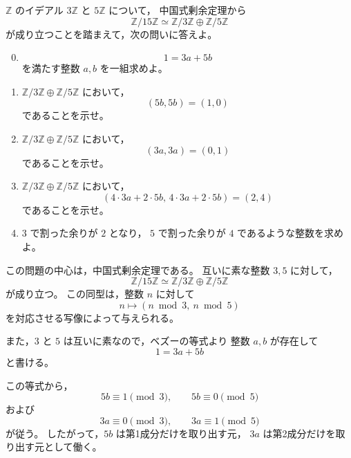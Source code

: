 
\begin{exercise}
	\(\mathbb{Z}\) のイデアル \(3\mathbb{Z}\) と \(5\mathbb{Z}\) について，
	中国式剰余定理から
	\[
	\mathbb{Z}/15\mathbb{Z}
	\simeq
	\mathbb{Z}/3\mathbb{Z}
	\oplus
	\mathbb{Z}/5\mathbb{Z}
	\]
	が成り立つことを踏まえて，次の問いに答えよ。
	
	\begin{enumerate}
		\setcounter{enumi}{-1}
		
		\item
		\[
		1=3a+5b
		\]
		を満たす整数 \(a,b\) を一組求めよ。
		
		\item
		\(\mathbb{Z}/3\mathbb{Z}\oplus\mathbb{Z}/5\mathbb{Z}\) において，
		\[
		(5b,5b)=(1,0)
		\]
		であることを示せ。
		
		\item
		\(\mathbb{Z}/3\mathbb{Z}\oplus\mathbb{Z}/5\mathbb{Z}\) において，
		\[
		(3a,3a)=(0,1)
		\]
		であることを示せ。
		
		\item
		\(\mathbb{Z}/3\mathbb{Z}\oplus\mathbb{Z}/5\mathbb{Z}\) において，
		\[
		(4\cdot 3a+2\cdot 5b,\,
		4\cdot 3a+2\cdot 5b)
		=
		(2,4)
		\]
		であることを示せ。
		
		\item
		\(3\) で割った余りが \(2\) となり，
		\(5\) で割った余りが \(4\) であるような整数を求めよ。
	\end{enumerate}
\end{exercise}

\begin{background}
	この問題の中心は，中国式剰余定理である。
	互いに素な整数 \(3,5\) に対して，
	\[
	\mathbb{Z}/15\mathbb{Z}
	\simeq
	\mathbb{Z}/3\mathbb{Z}
	\oplus
	\mathbb{Z}/5\mathbb{Z}
	\]
	が成り立つ。
	この同型は，整数 \(n\) に対して
	\[
	n \longmapsto (n \bmod 3,\ n \bmod 5)
	\]
	を対応させる写像によって与えられる。
	
	また，\(3\) と \(5\) は互いに素なので，ベズーの等式より
	整数 \(a,b\) が存在して
	\[
	1=3a+5b
	\]
	と書ける。
	
	この等式から，
	\[
	5b \equiv 1 \pmod{3},
	\qquad
	5b \equiv 0 \pmod{5}
	\]
	および
	\[
	3a \equiv 0 \pmod{3},
	\qquad
	3a \equiv 1 \pmod{5}
	\]
	が従う。
	したがって，\(5b\) は第1成分だけを取り出す元，
	\(3a\) は第2成分だけを取り出す元として働く。
\end{background}

